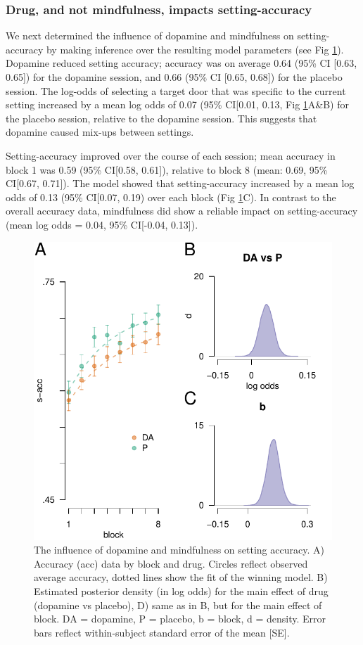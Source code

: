 \documentclass{article}
\begin{document}
\hypertarget{drug-and-not-mindfulness-impacts-setting-accuracy}{%
\subsubsection{Drug, and not mindfulness, impacts
setting-accuracy}\label{drug-and-not-mindfulness-impacts-setting-accuracy}}

We next determined the influence of dopamine and mindfulness on
setting-accuracy by making inference over the resulting model parameters
(see Fig \ref{fig:caccfig}). Dopamine reduced setting accuracy; accuracy
was on average 0.64 (95\% CI {[}0.63, 0.65{]}) for the dopamine session,
and 0.66 (95\% CI {[}0.65, 0.68{]}) for the placebo session. The
log-odds of selecting a target door that was specific to the current
setting increased by a mean log odds of 0.07 (95\% CI{[}0.01, 0.13, Fig
\ref{fig:caccfig}A\&B) for the placebo session, relative to the dopamine
session. This suggests that dopamine caused mix-ups between settings.

Setting-accuracy improved over the course of each session; mean accuracy
in block 1 was 0.59 (95\% CI{[}0.58, 0.61{]}), relative to block 8
(mean: 0.69, 95\% CI{[}0.67, 0.71{]}). The model showed that
setting-accuracy increased by a mean log odds of 0.13 (95\% CI{[}0.07,
0.19) over each block (Fig \ref{fig:caccfig}C). In contrast to the
overall accuracy data, mindfulness did show a reliable impact on
setting-accuracy (mean log odds = 0.04, 95\% CI{[}-0.04, 0.13{]}).

\begin{figure}

{\centering \includegraphics[width=0.7\linewidth]{../../images/cacc_fig} 

}

\caption{The influence of dopamine and mindfulness on setting accuracy. A) Accuracy (acc) data by block and drug. Circles reflect observed average accuracy, dotted lines show the fit of the winning model. B) Estimated posterior density (in log odds) for the main effect of drug (dopamine vs placebo), D) same as in B, but for the main effect of block. DA = dopamine, P = placebo, b = block, d = density. Error bars reflect within-subject standard error of the mean [SE].}\label{fig:caccfig}
\end{figure}
\end{document}
